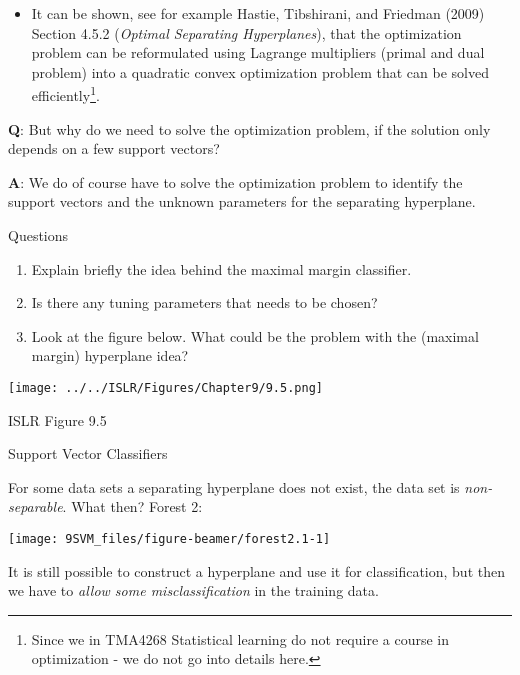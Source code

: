 \documentclass[10pt,ignorenonframetext,]{beamer}
\providecommand{\tightlist}{%
  \setlength{\itemsep}{0pt}\setlength{\parskip}{0pt}}
\begin{document}
\begin{frame}

\begin{itemize}
\tightlist
\item
  It can be shown, see for example Hastie, Tibshirani, and Friedman
  (2009) Section 4.5.2 (\emph{Optimal Separating Hyperplanes}), that the
  optimization problem can be reformulated using Lagrange multipliers
  (primal and dual problem) into a quadratic convex optimization problem
  that can be solved
  efficiently\footnote{Since we in TMA4268 Statistical learning do not require a course in optimization - we do not go into details here.}.
\end{itemize}

\vspace{4mm}

\textbf{Q}: But why do we need to solve the optimization problem, if the
solution only depends on a few support vectors?

\textbf{A}: We do of course have to solve the optimization problem to
identify the support vectors and the unknown parameters for the
separating hyperplane.

\end{frame}

\begin{frame}

\begin{block}{Questions}

\vspace{2mm}

\begin{enumerate}
\item
  Explain briefly the idea behind the maximal margin classifier.
\item
  Is there any tuning parameters that needs to be chosen?
\item
  Look at the figure below. What could be the problem with the (maximal
  margin) hyperplane idea?
\end{enumerate}

\centering

\texttt{[image: ../../ISLR/Figures/Chapter9/9.5.png]}
\small

ISLR Figure 9.5

\end{block}

\end{frame}

\begin{frame}{Support Vector Classifiers}
\protect\hypertarget{support-vector-classifiers}{}

For some data sets a separating hyperplane does not exist, the data set
is \emph{non-separable}. What then? Forest 2:

\begin{center}\texttt{[image: 9SVM\_files/figure-beamer/forest2.1-1]} \end{center}

It is still possible to construct a hyperplane and use it for
classification, but then we have to \emph{allow some misclassification}
in the training data.

\end{frame}
\end{document}
